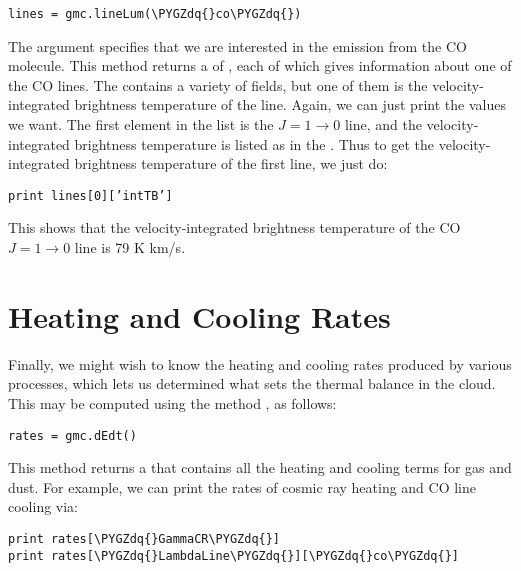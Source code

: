 \documentclass[letterpaper,10pt,english]{sphinxmanual}
\def\PYGZdq{\char`\"}
\begin{document}
\begin{Verbatim}[commandchars=\\\{\}]
lines = gmc.lineLum(\PYGZdq{}co\PYGZdq{})
\end{Verbatim}

The argument  specifies that we are interested in the emission
from the CO molecule. This method returns a  of , each
of which gives information about one of the CO lines. The 
contains a variety of fields, but one of them is the
velocity-integrated brightness temperature of the line. Again, we can
just print the values we want. The first element in the list is the
\(J = 1 \rightarrow 0\) line, and the velocity-integrated
brightness temperature is listed as  in the . Thus to
get the velocity-integrated brightness temperature of the first line,
we just do:

\begin{Verbatim}[commandchars=\\\{\}]
print lines[0][’intTB’]
\end{Verbatim}

This shows that the velocity-integrated brightness temperature of the
CO \(J = 1 \rightarrow 0\) line is 79 K km/s.


\section{Heating and Cooling Rates}
\label{quickstart:heating-and-cooling-rates}
Finally, we might wish to know the heating and cooling rates produced
by various processes, which lets us determined what sets the thermal
balance in the cloud. This may be computed using the method ,
as follows:

\begin{Verbatim}[commandchars=\\\{\}]
rates = gmc.dEdt()
\end{Verbatim}

This method returns a  that contains all the heating and
cooling terms for gas and dust. For example, we can print the rates of
cosmic ray heating and CO line cooling via:

\begin{Verbatim}[commandchars=\\\{\}]
print rates[\PYGZdq{}GammaCR\PYGZdq{}]
print rates[\PYGZdq{}LambdaLine\PYGZdq{}][\PYGZdq{}co\PYGZdq{}]
\end{Verbatim}
\end{document}
